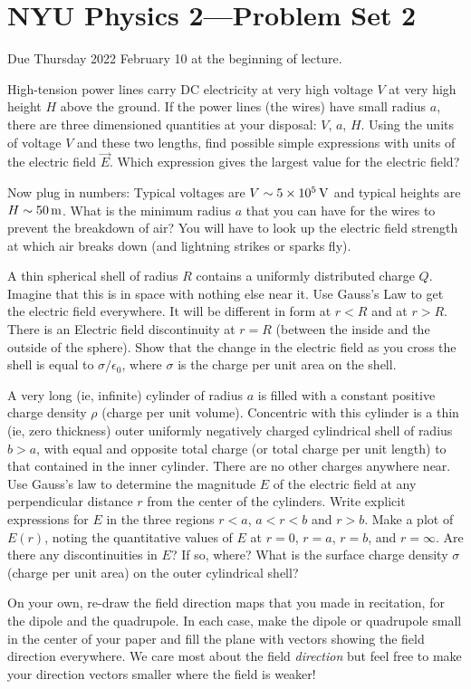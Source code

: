 \documentclass[12pt]{article}
\begin{document}
\section*{NYU Physics 2---Problem Set 2}

Due Thursday 2022 February 10 at the beginning of lecture.

\startproblem%
High-tension power lines carry DC electricity at very high voltage $V$ at
very high height $H$ above the ground.
If the power lines (the wires) have small radius $a$, there are three
dimensioned quantities at your disposal: $V$, $a$, $H$.
Using the units of voltage $V$ and these two lengths, find possible
simple expressions with units of the electric field $\vec{E}$.
Which expression gives the largest value for the electric field?

Now plug in numbers:
Typical voltages are $V\sim 5\times 10^5\,\mathrm{V}$ and typical heights are
$H\sim 50\,\mathrm{m}$.
What is the minimum radius $a$ that you can have for the wires to prevent
the breakdown of air?
You will have to look up the electric field strength at which air breaks
down (and lightning strikes or sparks fly).

\startproblem%
A thin spherical shell of radius $R$ contains a uniformly distributed
charge $Q$.  Imagine that this is in space with nothing else near
it. Use Gauss's Law to get the electric field everywhere. It will be
different in form at $r<R$ and at $r>R$. There is an Electric field
discontinuity at $r=R$ (between the inside and the outside of the sphere). Show
that the change in the electric field as you cross the shell is equal
to $\sigma/\epsilon_0$, where $\sigma$ is the charge per unit area on
the shell.

\startproblem%
A very long (ie, infinite) cylinder of radius $a$ is filled with a
constant positive charge density $\rho$ (charge per unit volume).
Concentric with this cylinder is a thin (ie, zero thickness) outer
uniformly negatively charged cylindrical shell of radius $b>a$, with
equal and opposite total charge (or total charge per unit length) to that
contained in the inner cylinder.  There are no other charges anywhere near.  Use
Gauss's law to determine the magnitude $E$ of the electric field at
any perpendicular distance $r$ from the center of the cylinders.
Write explicit expressions for $E$ in the three regions $r<a$, $a<r<b$
and $r>b$.  Make a plot of $E(r)$, noting the quantitative values of
$E$ at $r=0$, $r=a$, $r=b$, and $r=\infty$.  Are there any
discontinuities in $E$?  If so, where?  What is the surface charge
density $\sigma$ (charge per unit area) on the outer cylindrical
shell?

\startproblem%
On your own, re-draw the field direction maps that you made in
recitation, for the dipole and the quadrupole.
In each case, make the dipole or quadrupole small in the center of your paper and
fill the plane with vectors showing the field direction everywhere.
We care most about the field \emph{direction} but feel free to make
your direction vectors smaller where the field is weaker!
\end{document}
